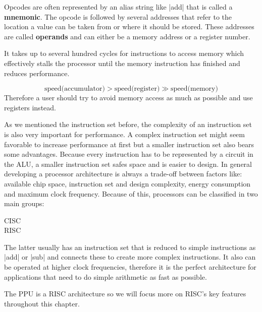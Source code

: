 Opcodes are often represented by an alias string like |add| that is called a \textbf{mnemonic}.
The opcode is followed by several addresses that refer to the location a value can be taken from or where it should be stored.
These addresses are called \textbf{operands} and can either be a memory address or a register number.

It takes up to several hundred cycles for instructions to access memory which effectively stalls the processor until the memory instruction has finished and reduces performance.

\begin{equation*}
    \text{speed(accumulator)} > \text{speed(register)} \gg \text{speed(memory)}
\end{equation*}
Therefore a user should try to avoid memory access as much as possible and use registers instead.

As we mentioned the instruction set before, the complexity of an instruction set is also very important for performance. 
A complex instruction set might seem favorable to increase performance at first but a smaller instruction set also bears some advantages.
Because every instruction has to be represented by a circuit in the \ac{ALU}, a smaller instruction set safes space and is easier to design.
In general developing a processor architecture is always a trade-off between factors like: available chip space, instruction set and design complexity, energy consumption and maximum clock frequency.
Because of this, processors can be classified in two main groups:
\begin{description}
    \item[\ac{CISC}]
    \item[\ac{RISC}]
\end{description}
The latter usually has an instruction set that is reduced to simple instructions as |add| or |sub| and connects these to create more complex instructions.
It also can be operated at higher clock frequencies, therefore it is the perfect architecture for applications that need to do simple arithmetic as fast as possible.

The \ac{PPU} is a \ac{RISC} architecture so we will focus more on \ac{RISC}'s key features throughout this chapter.

